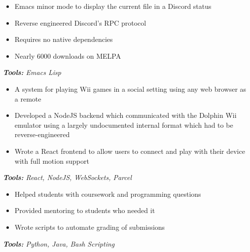\documentclass[10pt,letter]{altacv}
\begin{document}
\divider

\begin{itemize}
\item Emacs minor mode to display the current file in a Discord status
\item Reverse engineered Discord's RPC protocol
\item Requires no native dependencies
\item Nearly 6000 downloads on MELPA
\end{itemize}
\textit{\textbf{Tools:} Emacs Lisp}

\divider

\begin{itemize}
\item A system for playing Wii games in a social setting using any web browser as a remote
\item Developed a NodeJS backend which communicated with the Dolphin Wii emulator using a largely undocumented internal format which had to be reverse-engineered
\item Wrote a React frontend to allow users to connect and play with their device with full motion support
\end{itemize}
\textit{\textbf{Tools:} React, NodeJS, WebSockets, Parcel}


\smallskip 


\begin{itemize}
  \item Helped students with coursework and programming questions
  \item Provided mentoring to students who needed it
  \item Wrote scripts to automate grading of submissions
\end{itemize}
\textit{\textbf{Tools:} Python, Java, Bash Scripting}

\clearpage
\end{document}
